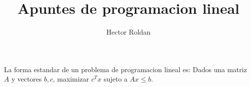 \documentclass{article}
\title{Apuntes de programacion lineal}
\author{Hector Roldan}
\begin{document}
\maketitle

La forma estandar de un problema de programacion lineal es:
Dados una matriz $A$ y vectores $b,c$, maximizar $c^Tx$ sujeto a
$Ax\leq b$.
\end{document}

